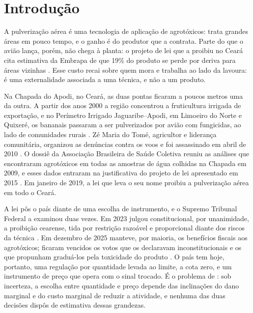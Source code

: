 \chapter{Introdução}
\label{sec:introducao}

A pulverização aérea é uma tecnologia de aplicação de agrotóxicos: trata
grandes áreas em pouco tempo, e o ganho é do produtor que a contrata. Parte do
que o avião lança, porém, não chega à planta: o projeto de lei que a proibiu
no Ceará cita estimativa da Embrapa de que 19\% do produto se perde por deriva
para áreas vizinhas \cite{ceara2015pl18}. Esse custo recai sobre quem mora e
trabalha ao lado da lavoura: é uma externalidade associada a uma técnica, e
não a um produto.

Na Chapada do Apodi, no Ceará, as duas pontas ficaram a poucos metros uma da
outra. A partir dos anos 2000 a região concentrou a fruticultura irrigada de
exportação, e no Perímetro Irrigado Jaguaribe--Apodi, em Limoeiro do Norte e
Quixeré, os bananais passaram a ser pulverizados por avião com fungicidas, ao
lado de comunidades rurais \cite[p.~171--174]{marinho2011dimensao}. Zé Maria
do Tomé, agricultor e liderança comunitária, organizou as denúncias contra os
voos e foi assassinado em abril de 2010
\cite[p.~535]{teixeira2011rebulico}. O dossiê da Associação Brasileira de Saúde
Coletiva reuniu as análises que encontraram agrotóxicos em todas as amostras
de água colhidas na Chapada em 2009, e esses dados entraram na justificativa do
projeto de lei apresentado em 2015 \cite{ceara2015pl18}. Em janeiro de 2019, a
lei que leva o seu nome proibiu a pulverização aérea em todo o Ceará.

A lei pôs o país diante de uma escolha de instrumento, e o Supremo Tribunal
Federal a examinou duas vezes. Em 2023 julgou constitucional, por unanimidade,
a proibição cearense, tida por restrição razoável e proporcional diante dos
riscos da técnica \cite{stf2023adi6137}. Em dezembro de 2025 manteve, por maioria, os
benefícios fiscais aos agrotóxicos; ficaram vencidos os votos que os
declaravam inconstitucionais e os que propunham graduá-los pela toxicidade do
produto \cite{stf2025adi5553}. O país tem hoje, portanto, uma regulação por
quantidade levada ao limite, a cota zero, e um instrumento de preço que opera com o sinal trocado. É o problema
de : sob incerteza, a escolha entre quantidade e
preço depende das inclinações do dano marginal e do custo marginal de reduzir
a atividade, e nenhuma das duas decisões dispôs de estimativa dessas
grandezas.

